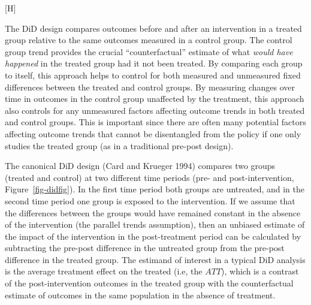 \documentclass[
  letterpaper,
  DIV=11,
  numbers=noendperiod]{scrartcl}
\makeatletter
\renewenvironment{figure}%
   {\renewcommand\familydefault\sfdefault
    \@float{figure}}
   {\end@float}
\makeatother
\begin{document}
\begin{figure}[H]


\caption{\label{fig-didfig}Stylized example of
difference-in-differences}

\end{figure}%

The DiD design compares outcomes before and after an intervention in a
treated group relative to the same outcomes measured in a control group.
The control group trend provides the crucial ``counterfactual'' estimate
of what \emph{would have happened} in the treated group had it not been
treated. By comparing each group to itself, this approach helps to
control for both measured and unmeasured fixed differences between the
treated and control groups. By measuring changes over time in outcomes
in the control group unaffected by the treatment, this approach also
controls for any unmeasured factors affecting outcome trends in both
treated and control groups. This is important since there are often many
potential factors affecting outcome trends that cannot be disentangled
from the policy if one only studies the treated group (as in a
traditional pre-post design).

The canonical DiD design (Card and Krueger 1994) compares two groups
(treated and control) at two different time periods (pre- and
post-intervention, Figure~\ref{fig-didfig}). In the first time period
both groups are untreated, and in the second time period one group is
exposed to the intervention. If we assume that the differences between
the groups would have remained constant in the absence of the
intervention (the parallel trends assumption), then an unbiased estimate
of the impact of the intervention in the post-treatment period can be
calculated by subtracting the pre-post difference in the untreated group
from the pre-post difference in the treated group. The estimand of
interest in a typical DiD analysis is the average treatment effect on
the treated (i.e, the \(ATT\)), which is a contrast of the
post-intervention outcomes in the treated group with the counterfactual
estimate of outcomes in the same population in the absence of treatment.
\end{document}

